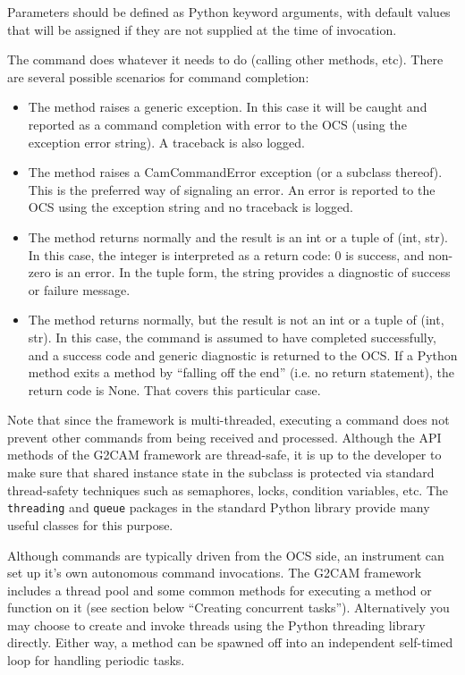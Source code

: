 \documentclass[11pt]{report}
\begin{document}
Parameters should be defined as Python keyword arguments, with default
values that will be assigned if they are not supplied at the time of
invocation. 

The command does whatever it needs to do (calling other methods,
etc). There are several possible scenarios for command completion: 
\begin{itemize}
\item The method raises a generic exception. In this case it will be
caught and reported as a command completion with error to the OCS (using
the exception error string). A traceback is also logged. 

\item The method raises a CamCommandError exception (or a subclass
thereof). This is the preferred way of signaling an error. An error is
reported to the OCS using the exception string and no traceback is
logged. 

\item The method returns normally and the result is an int or a tuple of
(int, str). In this case, the integer is interpreted as a return code: 0
is success, and non-zero is an error. In the tuple form, the string
provides a diagnostic of success or failure message. 

\item The method returns normally, but the result is not an int or a
tuple of (int, str). In this case, the command is assumed to have
completed successfully, and a success code and generic diagnostic is
returned to the OCS. If a Python method exits a method by ``falling off
the end'' (i.e. no return statement), the return code is None.
That covers this particular case. 
\end{itemize}
Note that since the framework is multi-threaded, executing a command
does not prevent other commands from being received and processed.
Although the API methods of the G2CAM framework are thread-safe, it is
up to the developer to make sure that shared instance 
state in the subclass is protected via standard thread-safety techniques
such as semaphores, locks, condition variables, etc. 
The {\tt threading} and {\tt queue} packages in the standard Python
library provide many useful classes for this purpose. 

Although commands are typically driven from the OCS side, an instrument
can set up it's own autonomous command invocations. 
The G2CAM framework includes a thread pool and some common methods for
executing a method or function on it (see section below ``Creating
concurrent tasks'').
Alternatively you may choose to create and invoke threads using
the Python threading library directly. Either way, a method can be
spawned off into an independent self-timed loop for handling periodic
tasks. 
\end{document}
